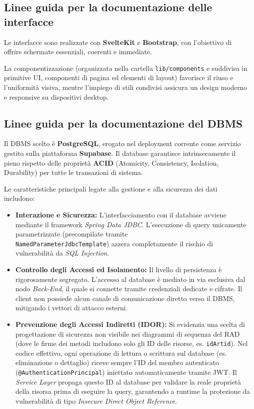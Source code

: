 
\subsection{Linee guida per la documentazione delle interfacce}
Le interfacce sono realizzate con \textbf{SvelteKit} e \textbf{Bootstrap}, con l'obiettivo di offrire schermate essenziali, coerenti e immediate. 

La componentizzazione (organizzata nella cartella \texttt{lib/components} e suddivisa in primitive UI, componenti di pagina ed elementi di layout) favorisce il riuso e l'uniformità visiva, mentre l'impiego di stili condivisi assicura un design moderno e responsive su dispositivi desktop.

\subsection{Linee guida per la documentazione del DBMS}
Il DBMS scelto \`e \textbf{PostgreSQL}, erogato nel deployment corrente come servizio gestito sulla piattaforma \textbf{Supabase}. Il database garantisce intrinsecamente il pieno rispetto delle propriet\`a \textbf{ACID} (Atomicity, Consistency, Isolation, Durability) per tutte le transazioni di sistema.

Le caratteristiche principali legate alla gestione e alla sicurezza dei dati includono:
\begin{itemize}
    \item \textbf{Interazione e Sicurezza:} L'interfacciamento con il database avviene mediante il framework \textit{Spring Data JDBC}. L'esecuzione di query unicamente parametrizzate (precompilate tramite\\ \texttt{NamedParameterJdbcTemplate}) azzera completamente il rischio di vulnerabilit\`a da \textit{SQL Injection}.
    \item \textbf{Controllo degli Accessi ed Isolamento:} Il livello di persistenza \`e rigorosamente segregato. L'accesso al database \`e mediato in via esclusiva dal nodo \textit{Back-End}, il quale si connette tramite credenziali dedicate e cifrate. Il client non possiede alcun canale di comunicazione diretto verso il DBMS, mitigando i vettori di attacco esterni.
    \item \textbf{Prevenzione degli Accessi Indiretti (IDOR):} Si evidenzia una scelta di progettazione di sicurezza non visibile nei diagrammi di sequenza del RAD (dove le firme dei metodi includono solo gli ID delle risorse, es. \texttt{idArtid}). Nel codice effettivo, ogni operazione di lettura o scrittura sul database (es. eliminazione o dettaglio) riceve sempre l'ID del membro autenticato (\texttt{@AuthenticationPrincipal}) iniettato automaticamente tramite JWT. Il \textit{Service Layer} propaga questo ID al database per validare la reale proprietà della risorsa prima di eseguire la query, garantendo a runtime la protezione da vulnerabilità di tipo \textit{Insecure Direct Object Reference}.
\end{itemize}

